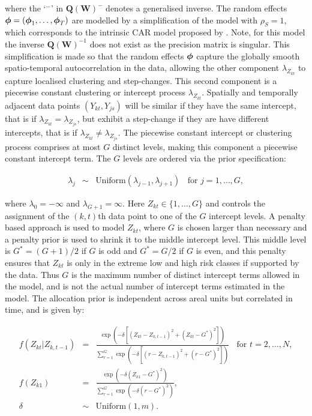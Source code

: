 \documentclass[article, nojss]{jss}
\newcommand{\bd}[1]{\ensuremath{\mbox{\boldmath $#1$}}}
\begin{document}
where the `$^{-}$' in $\mathbf{Q}(\mathbf{W})^{-}$ denotes a generalised inverse. The random effects $\bd{\phi}=(\bd{\phi}_{1},\ldots,\bd{\phi}_{T})$ are modelled by a simplification of the  model with $\rho_S=1$, which corresponds to the intrinsic CAR model proposed by \cite{besag1991}. Note, for this model the inverse $\mathbf{Q}(\mathbf{W})^{-1}$ does not exist as the precision matrix is singular. This simplification is made so that the random effects $\bd{\phi}$ capture the globally smooth spatio-temporal autocorrelation in the data, allowing the other component $\lambda_{Z_{kt}}$ to capture localised clustering and step-changes. This second component is a piecewise constant clustering or intercept process $\lambda_{Z_{kt}}$. Spatially and  temporally adjacent data points $(Y_{kt}, Y_{js})$ will be similar if they have the same intercept, that is if $\lambda_{Z_{kt}}=\lambda_{Z_{js}}$, but exhibit a step-change if they are have different intercepts, that is if $\lambda_{Z_{kt}}\neq\lambda_{Z_{js}}$. The piecewise constant intercept or clustering process  comprises at most $G$ distinct levels, making this component a piecewise constant intercept term. The $G$ levels are ordered via the prior specification:

\begin{eqnarray}
\lambda_{j}&\sim&\mbox{Uniform}(\lambda_{j-1},\lambda_{j+1})~~~~\mbox{for }j=1,\dots,G,\label{carcluster2}
\end{eqnarray}

where $\lambda_{0}=-\infty$ and  $\lambda_{G+1}=\infty$. Here $Z_{kt}\in\{1,\ldots,G\}$ and controls the assignment of the $(k,t)$th data point to one of the $G$ intercept levels. A penalty based approach is used to model $Z_{kt}$, where $G$ is chosen larger than necessary and a penalty prior is used  to shrink it to the middle intercept level.  This middle level is $G^{*}=(G+1)/2$ if $G$ is odd and $G^{*}=G/2$ if $G$ is even, and this penalty ensures that $Z_{kt}$ is only in the extreme low and high risk classes if supported by the data. Thus $G$ is the maximum number of distinct intercept terms allowed in the model, and is not the actual number of intercept terms estimated in the model. The allocation prior is independent across areal units but correlated in time, and is given by:


\begin{eqnarray}
f(Z_{kt}|Z_{k,t-1})&=&\frac{\exp(-\delta[(Z_{kt}-Z_{k,t-1})^{2} +(Z_{kt}-G^{*})^{2}])}{\sum_{r=1}^{G}\exp(-\delta[(r-Z_{k,t-1})^{2}+(r-G^{*})^{2}])}~~~~\mbox{for } t=2,\ldots,N,\label{carcluster3}\\
f(Z_{k1})&=&\frac{\exp(-\delta(Z_{k1}-G^{*})^{2})}{\sum_{r=1}^{G}\exp(-\delta(r-G^{*})^{2})},\nonumber\\
\delta&\sim&\mbox{Uniform}(1,m).\nonumber
\end{eqnarray}
\end{document}
